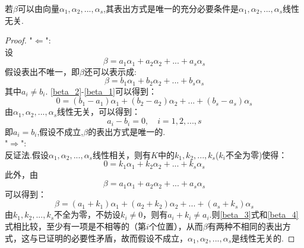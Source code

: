 \documentclass[blue,normal,cn]{elegantnote}
\begin{document}
\begin{theorem}
\begin{proposition}
    \label{linear_show_only}
若$β$可以由向量$α_1,α_2,...,α_s$,其表出方式是唯一的充分必要条件是$α_1,α_2,...,α_s$线性无关.
\end{proposition}

\begin{proof}
    "$\Leftarrow$":\\
    设
    \begin{equation}
    β=a_1α_1+a_2α_2+...+a_sα_s  \label{beta_1}
    \end{equation}
    假设表出不唯一，即$β$还可以表示成:
    \begin{equation}
    β=b_1 α_1+b_2 α_2+...+b_s α_s  \label{beta_2}
    \end{equation}
    其中$a_i ≠ b_i$.
    \eqref{beta_2}-\eqref{beta_1}可以得到：
    \begin{equation*}
        0=(b_1-a_1)α_1+(b_2-a_2)α_2+...+(b_s-a_s)α_s 
    \end{equation*}
    由$α_1,α_2,...,α_s$线性无关，可以得到：
    \begin{equation*}
        a_i-b_i=0,\quad i=1,2,...,s
    \end{equation*}
    即$a_i=b_i$,假设不成立,$β$的表出方式是唯一的.\\
    "$\Rightarrow$":\\
    反证法.假设$α_1,α_2,...,α_s$线性相关，则有$K$中的$k_1,k_2,...,k_s$($k_i$不全为零)使得：
    \begin{equation*}
        0=k_1α_1+k_2α_2+...+k_sα_s 
    \end{equation*}
    此外，由
    \begin{equation}
    β=a_1α_1+a_2α_2+...+a_sα_s  \label{beta_3}
    \end{equation}
    可以得到：
    \begin{equation}
        β=(a_1+k_1)α_1+(a_2+k_2)α_2+...+(a_s+k_s)α_s  \label{beta_4}
    \end{equation}
    由$k_1,k_2,...,k_s$不全为零，不妨设$k_i ≠ 0$，则有$a_i+k_i ≠ a_i$.则\eqref{beta_3}式和\eqref{beta_4}式相比较，至少有一项是不相等的（第$i$个位置），从而$β$有两种不相同的表出方式，这与已证明的必要性矛盾，故而假设不成立，$α_1,α_2,...,α_s$是线性无关的.
\end{proof}


\end{theorem}
\end{document}
